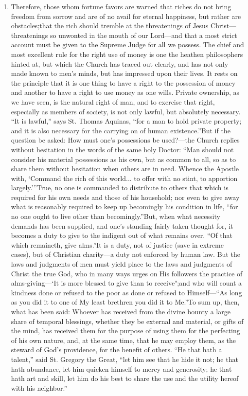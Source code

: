 \documentclass{book}
\begin{document}
\begin{enumerate}
	\item Therefore, those whom fortune favors are warned that riches do not bring freedom from sorrow and are of no avail for eternal happiness, but rather are obstacles;\footnotemark[8] that the rich should tremble at the threatenings of Jesus Christ—threatenings so unwonted in the mouth of our Lord\footnotemark[9]—and that a most strict account must be given to the Supreme Judge for all we possess. The chief and most excellent rule for the right use of money is one the heathen philosophers hinted at, but which the Church has traced out clearly, and has not only made known to men’s minds, but has impressed upon their lives. It rests on the principle that it is one thing to have a right to the possession of money and another to have a right to use money as one wills. Private ownership, as we have seen, is the natural right of man, and to exercise that right, especially as members of society, is not only lawful, but absolutely necessary. “It is lawful,” says St. Thomas Aquinas, “for a man to hold private property; and it is also necessary for the carrying on of human existence.”\footnotemark[10] But if the question be asked: How must one’s possessions be used?—the Church replies without hesitation in the words of the same holy Doctor: “Man should not consider his material possessions as his own, but as common to all, so as to share them without hesitation when others are in need. Whence the Apostle with, ‘Command the rich of this world... to offer with no stint, to apportion largely.’”\footnotemark[11] True, no one is commanded to distribute to others that which is required for his own needs and those of his household; nor even to give away what is reasonably required to keep up becomingly his condition in life, “for no one ought to live other than becomingly.”\footnotemark[12] But, when what necessity demands has been supplied, and one’s standing fairly taken thought for, it becomes a duty to give to the indigent out of what remains over. “Of that which remaineth, give alms.”\footnotemark[13] It is a duty, not of justice (save in extreme cases), but of Christian charity—a duty not enforced by human law. But the laws and judgments of men must yield place to the laws and judgments of Christ the true God, who in many ways urges on His followers the practice of alms-giving—‘It is more blessed to give than to receive";\footnotemark[14] and who will count a kindness done or refused to the poor as done or refused to Himself—“As long as you did it to one of My least brethren you did it to Me.”\footnotemark[15] To sum up, then, what has been said: Whoever has received from the divine bounty a large share of temporal blessings, whether they be external and material, or gifts of the mind, has received them for the purpose of using them for the perfecting of his own nature, and, at the same time, that he may employ them, as the steward of God’s providence, for the benefit of others. “He that hath a talent,” said St. Gregory the Great, “let him see that he hide it not; he that hath abundance, let him quicken himself to mercy and generosity; he that hath art and skill, let him do his best to share the use and the utility hereof with his neighbor.”\footnotemark[16]



\end{enumerate}
\end{document}

